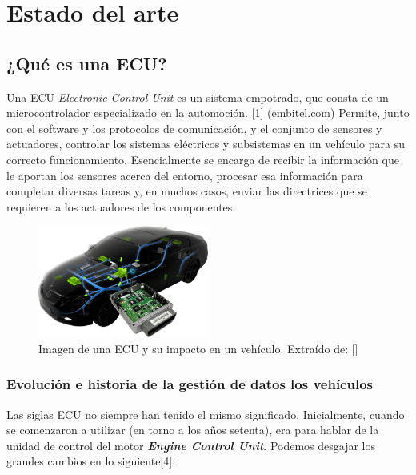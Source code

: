 \chapter{Estado del arte}


\section{¿Qué es una ECU?}


Una ECU \textit{Electronic Control Unit} es un sistema empotrado, que consta de un microcontrolador especializado en la automoción. [1] (embitel.com) Permite, junto con el software y los protocolos de comunicación, y el conjunto de sensores y actuadores, controlar los sistemas eléctricos y subsistemas en un vehículo para su correcto funcionamiento. 
Esencialmente se encarga de recibir la información que le aportan los sensores acerca del entorno, procesar esa información para completar diversas tareas y, en muchos casos, enviar las directrices que se requieren a los actuadores de los componentes.\newline

\begin{figure}[h]
    \centering
    \includegraphics[width=0.5\textwidth]{imagenes/ECU_autotechdrive.png}
    \caption{Imagen de una ECU y su impacto en un vehículo. Extraído de: []}
\end{figure}

\subsection{Evolución e historia de la gestión de datos los vehículos}

Las siglas ECU no siempre han tenido el mismo significado. Inicialmente, cuando se comenzaron a utilizar (en torno a los años setenta), era para hablar de la unidad de control del motor \textit{\textbf{Engine Control Unit}}. Podemos desgajar los grandes cambios en lo siguiente[4]:

